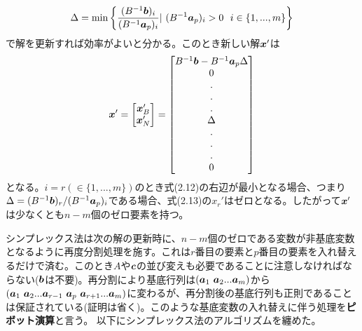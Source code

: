 \documentclass[dvipdfmx, 9pt, a4paper]{jsarticle}
\numberwithin{equation}{section}
\newcommand{\bm}[1]{{\mbox{\boldmath $#1$}}}
\begin{document}
\begin{equation}
\Delta={\rm min} \left\{ \frac{(B^{-1}\bm b)_i}{(B^{-1}\bm a_p)_i}|~(B^{-1}\bm a_p)_i>0~~i \in \{1, ..., m\} \right\}
\end{equation}
で解を更新すれば効率がよいと分かる。このとき新しい解$\bm x'$は
\begin{equation}
\bm x'=
\begin{bmatrix}
\bm x_B' \\ \bm x_N'
\end{bmatrix}
=
\begin{bmatrix}
B^{-1}\bm b - B^{-1}\bm a_p\Delta \\ 0 \\ . \\ .\\. \\ \Delta \\.\\.\\.\\0
\end{bmatrix}
\end{equation}
となる。$i=r(\in \{1, ..., m\})$のとき式(2.12)の右辺が最小となる場合、つまり$\Delta=(B^{-1}\bm b)_r/(B^{-1}\bm a_p)_i$である場合、式(2.13)の$x_r'$はゼロとなる。したがって$\bm x'$は少なくとも$n-m$個のゼロ要素を持つ。\par
シンプレックス法は次の解の更新時に、$n-m$個のゼロである変数が非基底変数となるように再度分割処理を施す。これは$r$番目の要素と$p$番目の要素を入れ替えるだけで済む。このとき$A$や$\bm c$の並び変えも必要であることに注意しなければならない($\bm b$は不要)。再分割により基底行列は$(\bm a_1~\bm a_2...\bm a_m)$から$(\bm a_1~\bm a_2...\bm a_{r-1}~\bm a_{p}~\bm a_{r+1}...\bm a_m)$に変わるが、再分割後の基底行列も正則であることは保証されている(証明は省く)。このような基底変数の入れ替えに伴う処理を{\bf ピボット演算}と言う。
以下にシンプレックス法のアルゴリズムを纏めた。
\end{document}
